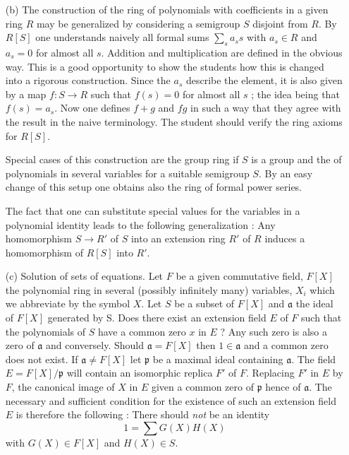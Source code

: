 \begin{enumerate}[(1)]
\begin{itemize}
\item[(b)] The construction of the ring of polynomials with coefficients in
  a given ring $R$ may be generalized by considering a semigroup $S$
  disjoint from $R$. By $R[S]$ one understands naively all formal sums
  $\sum\limits_s a_s s $ with $a_s \in R$ and $a_s =0$ for almost all
  $s$. Addition and multiplication are defined in the obvious
  way. This is a good opportunity to show the students how this is
  changed into a rigorous construction. Since the $a_s$ describe the
  element, it is also given by a map $f: S \to R$ such that $f(s) = 0$
  for almost all $s$ ; the idea being that $f(s) = a_s$. Now one
  defines $f + g$ and $fg$ in such a way that they agree with the
  result in the naive terminology. The student should verify the ring
  axioms for $R[S]$.

Special cases of this construction are the group ring if $S$ is a
group and the of polynomials in several variables for a suitable
semigroup $S$. By an easy change of this setup one obtains also the
ring of formal power series.

The fact that one can substitute special values for the variables in a
polynomial identity leads to the following generalization : Any\pageoriginale
homomorphism $S \to R'$ of $S$ into an extension ring $R'$ of $R$
induces a homomorphism of $R[S]$ into $R'$.

\item[(c)] Solution of sets of equations. Let $F$ be a given
  commutative field, $F[X]$ the polynomial ring in several (possibly
  infinitely many) variables, $X_i$ which we abbreviate by the symbol
  $X$. Let $S$ be a subset of $F[X]$ and $\mathfrak{a}$ the ideal of
  $F[X]$ generated by S. Does there exist an extension field $E$ of
  $F$ such that the polynomials of $S$ have a common zero $x$ in $E$ ?
  Any such zero is also a zero of $\mathfrak{a}$ and
  conversely. Should $\mathfrak{a} = F [X]$ then $1 \in \mathfrak{a}$
  and a common zero does not exist. If $\mathfrak{a} \neq F [X]$ let
  $\mathfrak{p}$ be a maximal ideal containing $\mathfrak{a}$. The
  field $E = F [X] / \mathfrak{p}$ will contain an isomorphic replica
  $F'$ of $F$. Replacing $F'$ in $E$ by $F$, the canonical image of
  $X$ in $E$ given a common zero of $\mathfrak{p}$ hence of
  $\mathfrak{a}$. The necessary and sufficient condition for the
  existence of such an extension field $E$ is therefore the following
  : There should \textit{not} be an identity
\begin{equation*}
1 = \sum G (X) H(X) \tag{1}
\end{equation*}
with $G(X) \in F [X]$ and $H(X) \in S$.


\end{itemize}
\end{enumerate}
